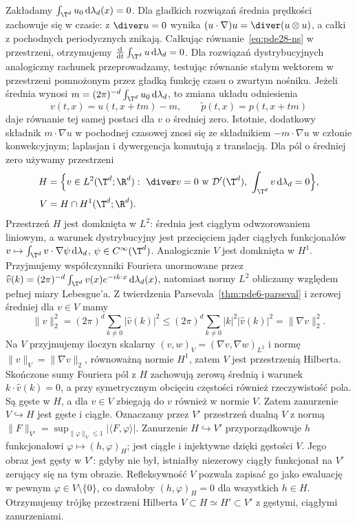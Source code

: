 Zakładamy $\int_{\T^d}u_0\,\mathrm d\lambda_d(x)=0$.
Dla gładkich rozwiązań średnia prędkości zachowuje się
w czasie: z $\diver u=0$ wynika
$(u\cdot\nabla)u=\diver(u\otimes u)$, a całki
z pochodnych periodycznych znikają. Całkując
równanie~\eqref{eq:pde28-ns} w przestrzeni, otrzymujemy
$\frac{\mathrm d}{\mathrm dt}\int_{\T^d}u\,\mathrm d\lambda_d=0$.
Dla rozwiązań dystrybucyjnych analogiczny rachunek
przeprowadzamy, testując równanie stałym wektorem
w przestrzeni pomnożonym przez gładką funkcję czasu
o zwartym nośniku.
Jeżeli średnia wynosi $m=(2\pi)^{-d}\int_{\T^d}u_0\,
\mathrm d\lambda_d$, to zmiana układu odniesienia
\[
 v(t,x)=u(t,x+tm)-m,\qquad
 \widetilde p(t,x)=p(t,x+tm)
\]
daje równanie tej samej postaci dla $v$ o średniej zero.
Istotnie, dodatkowy składnik $m\cdot\nabla u$
w pochodnej czasowej znosi się ze składnikiem
$-m\cdot\nabla u$ w członie konwekcyjnym;
laplasjan i dywergencja komutują z translacją.
Dla pól o średniej zero używamy przestrzeni
\[
 \begin{aligned}
 H&=\Bigl\{v\in L^2(\T^d;\R^d):\
 \diver v=0\text{ w }\mathcal D'(\T^d),\
 \int_{\T^d}v\,\mathrm d\lambda_d=0\Bigr\},\\
 V&=H\cap H^1(\T^d;\R^d).
 \end{aligned}
\]
Przestrzeń $H$ jest domknięta w $L^2$: średnia
jest ciągłym odwzorowaniem liniowym, a warunek
dystrybucyjny jest przecięciem jąder ciągłych
funkcjonałów $v\mapsto\int_{\T^d}v\cdot\nabla\psi\,
\mathrm d\lambda_d$, $\psi\in C^\infty(\T^d)$.
Analogicznie $V$ jest domknięta w $H^1$.
Przyjmujemy współczynniki Fouriera unormowane przez
$\widehat v(k)=(2\pi)^{-d}\int_{\T^d}v(x)e^{-ik\cdot x}
\,\mathrm d\lambda_d(x)$, natomiast normy $L^2$
obliczamy względem pełnej miary Lebesgue'a.
Z twierdzenia Parsevala~\ref{thm:pde6-parseval}
i zerowej średniej dla $v\in V$ mamy
\[
 \|v\|_2^2=(2\pi)^d\sum_{k\ne0}|\widehat v(k)|^2
 \le (2\pi)^d\sum_{k\ne0}|k|^2|\widehat v(k)|^2
 =\|\nabla v\|_2^2.
\]
Na $V$ przyjmujemy iloczyn skalarny
$(v,w)_V=(\nabla v,\nabla w)_{L^2}$ i normę
$\|v\|_V=\|\nabla v\|_2$, równoważną normie $H^1$,
zatem $V$ jest przestrzenią Hilberta.
Skończone sumy Fouriera pól z $H$ zachowują zerową
średnią i warunek $k\cdot\widehat v(k)=0$,
a przy symetrycznym obcięciu częstości również
rzeczywistość pola. Są gęste w $H$, a dla $v\in V$
zbiegają do $v$ również w normie $V$.
Zatem zanurzenie $V\hookrightarrow H$ jest gęste
i ciągłe. Oznaczamy przez $V'$ przestrzeń dualną $V$
z normą $\|F\|_{V'}=\sup_{\|\varphi\|_V\le1}
|\langle F,\varphi\rangle|$.
Zanurzenie $H\hookrightarrow V'$ przyporządkowuje
$h$ funkcjonałowi $\varphi\mapsto(h,\varphi)_H$;
jest ciągłe i injektywne dzięki gęstości $V$.
Jego obraz jest gęsty w $V'$: gdyby nie był, istniałby
niezerowy ciągły funkcjonał na $V'$ zerujący się
na tym obrazie. Refleksywność $V$ pozwala zapisać go
jako ewaluację w pewnym $\varphi\in V\setminus\{0\}$,
co dawałoby $(h,\varphi)_H=0$ dla wszystkich $h\in H$.
Otrzymujemy trójkę przestrzeni Hilberta
$V\subset H\simeq H'\subset V'$ z gęstymi,
ciągłymi zanurzeniami.

